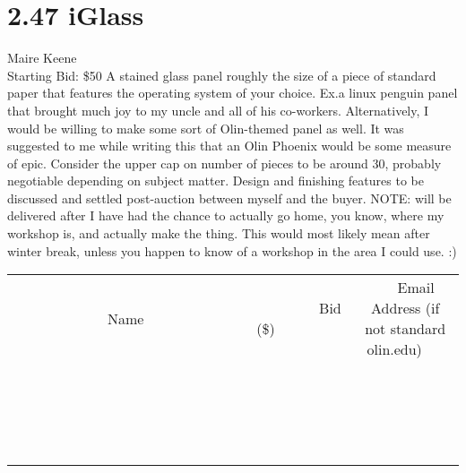 \documentclass[11pt]{article}
\begin{document}
\section*{2.47 iGlass}
Maire Keene
\\
Starting Bid: \$50
\newline
A stained glass panel roughly the size of a piece of standard paper that features the operating system of your choice. Ex.a linux penguin panel that brought much joy to my uncle and all of his co-workers. 
Alternatively, I would be willing to make some sort of Olin-themed panel as well. It was suggested to me while writing this that an Olin Phoenix would be some measure of epic.
Consider the upper cap on number of pieces to be around 30, probably negotiable depending on subject matter. 
Design and finishing features to be discussed and settled post-auction between myself and the buyer.
NOTE: will be delivered after I have had the chance to actually go home, you know, where my workshop is, and actually make the thing. This would most likely mean after winter break, unless you happen to know of a workshop in the area I could use.  :)
\\[3ex]
\begin{tabular}{c c c}
~~~~~~~~~~~~~Name~~~~~~~~~~~~~ & ~~~~~~~~~Bid (\$)~~~~~~~~~  & ~~~Email Address (if not standard olin.edu)~~~\\
 & & \\
\hline
 & & \\
\hline
 & & \\
\hline
 & & \\
\hline
 & & \\
\hline
 & & \\
\hline
 & & \\
\hline
 & & \\
\hline
 & & \\
\hline
 & & \\
\hline
 & & \\
\hline
 & & \\
\hline
 & & \\
\hline
 & & \\
\hline
 & & \\
\hline
 & & \\
\hline
 & & \\
\hline
 & & \\
\hline
 & & \\
\hline
\end{tabular}
\newpage
\end{document}
